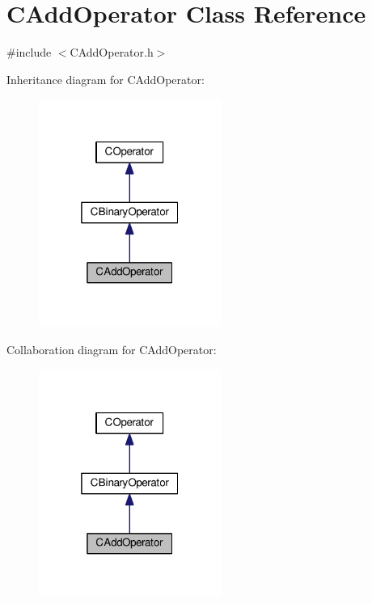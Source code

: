 \hypertarget{classCAddOperator}{}\section{C\+Add\+Operator Class Reference}
\label{classCAddOperator}


{\ttfamily \#include $<$C\+Add\+Operator.\+h$>$}



Inheritance diagram for C\+Add\+Operator\+:\nopagebreak
\begin{figure}[H]
\begin{center}
\leavevmode
\includegraphics[width=169pt]{classCAddOperator__inherit__graph}
\end{center}
\end{figure}


Collaboration diagram for C\+Add\+Operator\+:\nopagebreak
\begin{figure}[H]
\begin{center}
\leavevmode
\includegraphics[width=169pt]{classCAddOperator__coll__graph}
\end{center}
\end{figure}
